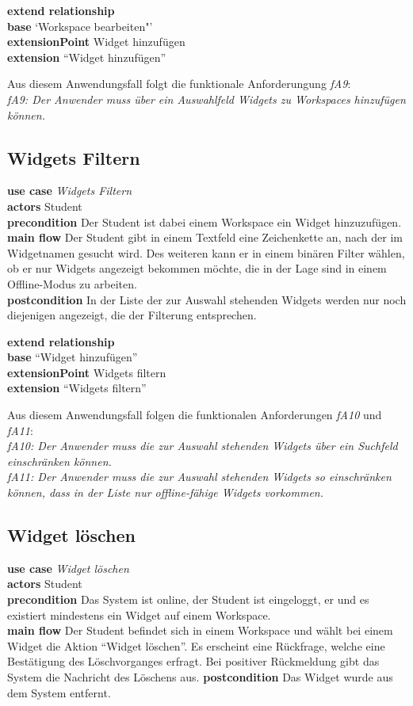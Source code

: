 \textbf{extend relationship}\\
\textbf{base} `Workspace bearbeiten"'\\
\textbf{extensionPoint} Widget hinzufügen\\
\textbf{extension} "`Widget hinzufügen"'

Aus diesem Anwendungsfall folgt die funktionale Anforderungung \emph{fA9}:\\
\emph{fA9: Der Anwender muss über ein Auswahlfeld Widgets zu Workspaces hinzufügen können.}\\ 

\subsection{Widgets Filtern}
\textbf{use case} \emph{Widgets Filtern}\\
\textbf{actors} Student\\
\textbf{precondition} Der Student ist dabei einem Workspace ein Widget hinzuzufügen.\\
\textbf{main flow} Der Student gibt in einem Textfeld eine Zeichenkette an, nach der im Widgetnamen gesucht wird. Des weiteren kann er in einem binären Filter wählen, ob er nur Widgets angezeigt bekommen möchte, die in der Lage sind in einem Offline-Modus zu arbeiten.\\
\textbf{postcondition} In der Liste der zur Auswahl stehenden Widgets werden nur noch diejenigen angezeigt, die der Filterung entsprechen.
 
\textbf{extend relationship}\\
\textbf{base} "`Widget hinzufügen"'\\
\textbf{extensionPoint} Widgets filtern\\
\textbf{extension} "`Widgets filtern"'
 
Aus diesem Anwendungsfall folgen die funktionalen Anforderungen \emph{fA10} und \emph{fA11}:\\
\emph{fA10: Der Anwender muss die zur Auswahl stehenden Widgets über ein Suchfeld einschränken können.}\\
\emph{fA11: Der Anwender muss die zur Auswahl stehenden Widgets so einschränken können, dass in der Liste nur offline-fähige Widgets vorkommen.}
 
 \subsection{Widget löschen}
\textbf{use case} \emph{Widget löschen}\\
\textbf{actors} Student\\
\textbf{precondition} Das System ist online, der Student ist eingeloggt, er und es existiert mindestens ein Widget auf einem Workspace.\\
\textbf{main flow} Der Student befindet sich in einem Workspace und wählt bei einem Widget die Aktion "`Widget löschen"'. Es erscheint eine Rückfrage, welche eine Bestätigung des Löschvorganges erfragt. Bei positiver Rückmeldung gibt das System die Nachricht des Löschens aus.
\textbf{postcondition} Das Widget wurde aus dem System entfernt.
 
